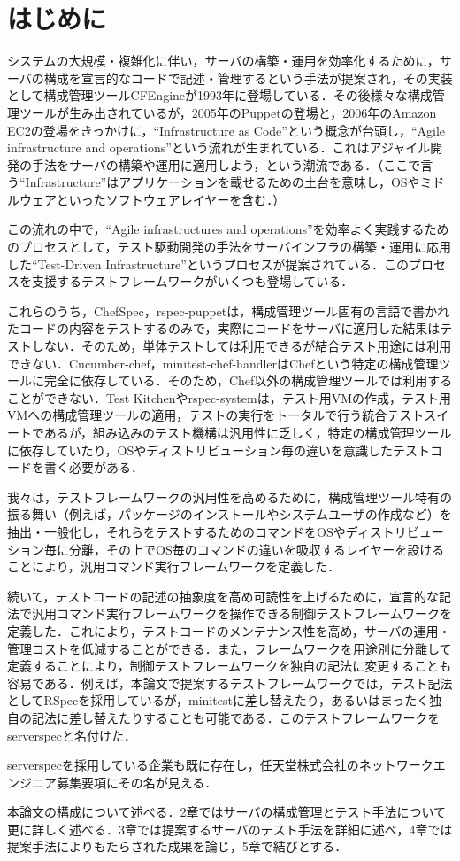 \section{はじめに}

システムの大規模・複雑化に伴い，サーバの構築・運用を効率化するために，サーバの構成を宣言的なコードで記述・管理するという手法が提案され，その実装として構成管理ツールCFEngine\cite{cfengine}が1993年に登場している．その後様々な構成管理ツールが生み出されているが\cite{cmt}，2005年のPuppetの登場\cite{puppet}と，2006年のAmazon EC2の登場\cite{ec2}をきっかけに，``Infrastructure as Code''という概念が台頭し，``Agile infrastructure and operations''\cite{agile infrastructure}という流れが生まれている．これはアジャイル開発の手法をサーバの構築や運用に適用しよう，という潮流である．（ここで言う``Infrastructure''はアプリケーションを載せるための土台を意味し，OSやミドルウェアといったソフトウェアレイヤーを含む．）

この流れの中で，``Agile infrastructures and operations''を効率よく実践するためのプロセスとして，テスト駆動開発の手法をサーバインフラの構築・運用に応用した``Test-Driven Infrastructure''\cite{test driven infrastructure with chef}というプロセスが提案されている．このプロセスを支援するテストフレームワークがいくつも登場している\cite{chefspec}\cite{rspec-puppet}\cite{cucumber-chef}\cite{minitest-chef-handler}\cite{test kitchen}\cite{rspec-system}．

これらのうち，ChefSpec，rspec-puppetは，構成管理ツール固有の言語で書かれたコードの内容をテストするのみで，実際にコードをサーバに適用した結果はテストしない．そのため，単体テストしては利用できるが結合テスト用途には利用できない．Cucumber-chef，minitest-chef-handlerはChefという特定の構成管理ツールに完全に依存している．そのため，Chef以外の構成管理ツールでは利用することができない．Test Kitchenやrspec-systemは，テスト用VMの作成，テスト用VMへの構成管理ツールの適用，テストの実行をトータルで行う統合テストスイートであるが，組み込みのテスト機構は汎用性に乏しく，特定の構成管理ツールに依存していたり，OSやディストリビューション毎の違いを意識したテストコードを書く必要がある．

我々は，テストフレームワークの汎用性を高めるために，構成管理ツール特有の振る舞い（例えば，パッケージのインストールやシステムユーザの作成など）を抽出・一般化し，それらをテストするためのコマンドをOSやディストリビューション毎に分離，その上でOS毎のコマンドの違いを吸収するレイヤーを設けることにより，汎用コマンド実行フレームワークを定義した．

続いて，テストコードの記述の抽象度を高め可読性を上げるために，宣言的な記法で汎用コマンド実行フレームワークを操作できる制御テストフレームワークを定義した．これにより，テストコードのメンテナンス性を高め，サーバの運用・管理コストを低減することができる．また，フレームワークを用途別に分離して定義することにより，制御テストフレームワークを独自の記法に変更することも容易である．例えば，本論文で提案するテストフレームワークでは，テスト記法としてRSpec\cite{rspec}を採用しているが，minitest\cite{minitest}に差し替えたり，あるいはまったく独自の記法に差し替えたりすることも可能である．このテストフレームワークをserverspec\cite{serverspec}と名付けた．

serverspecを採用している企業も既に存在し，任天堂株式会社のネットワークエンジニア募集要項にその名が見える．\cite{nintendo}

本論文の構成について述べる．2章ではサーバの構成管理とテスト手法について更に詳しく述べる．3章では提案するサーバのテスト手法を詳細に述べ，4章では提案手法によりもたらされた成果を論じ，5章で結びとする．
